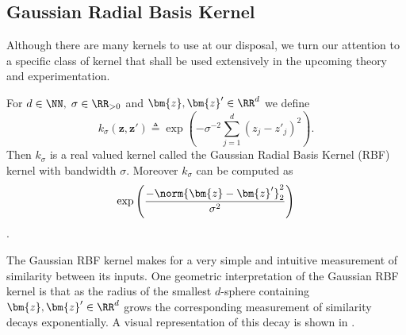 \subsection{Gaussian Radial Basis Kernel}\label{Section1.3}

Although there are many kernels to use at our disposal, we turn our attention to a specific class of kernel that shall be used extensively in the upcoming theory and experimentation.

\begin{defe} \label{defe: grbfk}
    For $d \in \NN, \; \sigma \in \RR_{>0}$ and $ \bm{z} , \bm{z}' \in \RR^d$ we define
    \[
        k_\sigma \left( \bm{z} , \bm{z}' \right) \triangleq \exp \left( - \sigma^{-2} \sum_{j=1}^{d} \left( {z}_j - {{z}'}_j \right)^2 \right).
    \]
    Then $k_\sigma$ is a real valued kernel called the Gaussian Radial Basis Kernel (RBF) kernel with bandwidth $\sigma$. Moreover $k_\sigma$ can be computed as
    \[
        \exp \left( \frac{- \norm{\bm{z} - {\bm{z}'}}_{2}^{2}}{\sigma^2} \right)
    \]
    \cite{SteinwartIngo2008SVMb}.
\end{defe}
The Gaussian RBF kernel makes for a very simple and intuitive measurement of similarity between its inputs. One geometric interpretation of the Gaussian RBF kernel is that as the radius of the smallest $d$-sphere containing $\bm{z} , \bm{z}' \in \RR^d$ grows the corresponding measurement of similarity decays exponentially. A visual representation of this decay is shown in .







